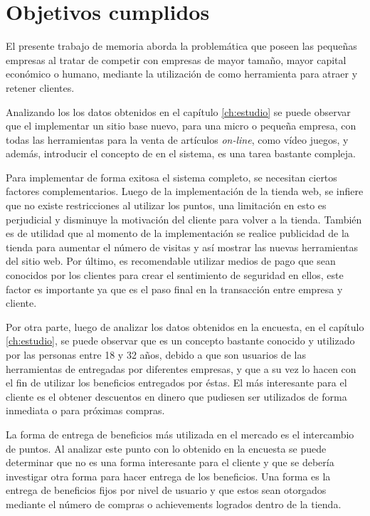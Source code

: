 

\section{Objetivos cumplidos}

El presente trabajo de memoria aborda la problemática que poseen las pequeñas
empresas al tratar de competir con empresas de mayor tamaño, mayor capital
económico o humano, mediante la utilización de {\gam} como herramienta para atraer
y retener clientes.

Analizando los los datos obtenidos en el capítulo \ref{ch:estudio} se puede observar que el
implementar un sitio base nuevo, para una micro o pequeña empresa, con todas las
herramientas para la venta de artículos \emph{on-line}, como vídeo juegos, y además,
introducir el concepto de {\gam} en el sistema, es una tarea bastante compleja.

Para implementar de forma exitosa el sistema completo, se necesitan ciertos factores
complementarios. Luego de la implementación de la tienda web, 
se infiere que no existe restricciones al utilizar los puntos, una limitación
en esto es perjudicial y disminuye la motivación del cliente para volver a la tienda. 
También es de utilidad que al momento de la implementación se realice publicidad
de la tienda para aumentar el número de visitas y así mostrar las nuevas herramientas
del sitio web. Por último, es recomendable utilizar medios de pago que sean conocidos
por los clientes para crear el sentimiento de seguridad en ellos, este factor es importante
ya que es el paso final en la transacción entre empresa y cliente. 

Por otra parte, luego de analizar los datos obtenidos en la encuesta, en el capítulo \ref{ch:estudio},
 se puede observar que {\gam} es un concepto bastante conocido y utilizado por las personas 
entre 18 y 32 años, debido a que son usuarios de las herramientas de {\gam} entregadas por
diferentes empresas, y que a su vez lo hacen con el fin de utilizar los beneficios entregados 
por éstas. El más interesante para el cliente es el obtener descuentos en dinero
que pudiesen ser utilizados de forma inmediata o para próximas compras.

La forma de entrega de beneficios más utilizada en el mercado es el intercambio de puntos. 
Al analizar este punto con lo obtenido en la encuesta se puede determinar que no es 
una forma interesante para el cliente y que se debería investigar otra forma para 
hacer entrega de los beneficios. Una forma es la entrega de beneficios fijos por nivel 
de usuario y que estos sean otorgados mediante el número de compras o achievements logrados
dentro de la tienda.

